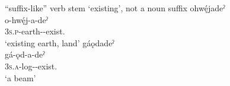 \ea\label{ex:fakevbsuf} “suffix-like” verb stem  ‘existing’, not a noun suffix
\ea ohwę́jadeˀ\\\label{ex:fakevbsufa}
\gll o-hwę́j-a-deˀ\\
 \textsc{3s.p}-earth-{\joinerA}-exist.{\stative}\\
\glt `existing earth, land'
\ex gáǫdadeˀ\\\label{ex:fakevbsufb}
\gll gá-ǫd-a-deˀ\\
 \textsc{3s.a}-log-{\joinerA}-exist.{\stative}\\
\glt `a beam'
\z
\z
